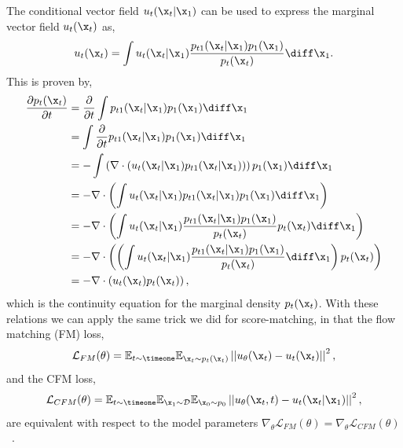 The conditional vector field $u_t(\x_t | \x_1)$ can be used to express the marginal vector field $u_t(\x_t)$ as,
\begin{equation}
    \label{eq:conditional_to_marginal}
    u_t(\x_t) = \int u_t(\x_t | \x_1) \frac{p_{t1}(\x_t | \x_1) p_1(\x_1)}{p_t(\x_t)} \diff \x_1.
\end{equation}
This is proven by,
\begin{equation}
    \begin{aligned}
        \frac{\partial p_t(\x_t)}{\partial t}
         & = \frac{\partial}{\partial t} \int p_{t1}(\x_t | \x_1) p_1(\x_1) \diff \x_1                                                            \\
         & = \int \frac{\partial}{\partial t} p_{t1}(\x_t | \x_1) p_1(\x_1) \diff \x_1                                                            \\
         & = - \int \left(\nabla \cdot (u_t(\x_t | \x_1) p_{t1}(\x_t | \x_1))\right) p_1(\x_1) \diff \x_1                                         \\
         & = - \nabla \cdot \left(\int u_t(\x_t | \x_1) p_{t1}(\x_t | \x_1) p_1(\x_1) \diff \x_1\right)                                           \\
         & = - \nabla \cdot \left(\int u_t(\x_t | \x_1) \frac{p_{t1}(\x_t | \x_1) p_1(\x_1)}{p_t(\x_t)} p_t(\x_t) \diff \x_1\right)               \\
         & = - \nabla \cdot \left(\left(\int u_t(\x_t | \x_1) \frac{p_{t1}(\x_t | \x_1) p_1(\x_1)}{p_t(\x_t)} \diff \x_1\right) p_t(\x_t) \right) \\
         & = - \nabla \cdot \left(u_t(\x_t) p_t(\x_t)\right),
    \end{aligned}
\end{equation}
which is the continuity equation for the marginal density $p_t(\x_t)$.
With these relations we can apply the same trick we did for score-matching, in that the flow matching (FM) loss,
\begin{equation}
    \label{eq:fm_loss}
    \mathcal{L}_{FM}(\theta) =
    \mathbb{E}_{t \sim \timeone}
    \mathbb{E}_{\x_t \sim p_t(\x_t)}
    \left|\left|u_\theta(\x_t) - u_t(\x_t)\right|\right|^2,
\end{equation}
and the CFM loss,
\begin{equation}
    \label{eq:cfm_loss}
    \mathcal{L}_{CFM}(\theta) =
    \mathbb{E}_{t \sim \timeone}
    \mathbb{E}_{\x_1 \sim \mathcal{D}}
    \mathbb{E}_{\x_0 \sim p_0}
    \left|\left|u_\theta(\x_t, t) - u_t(\x_t | \x_1)\right|\right|^2,
\end{equation}
are equivalent with respect to the model parameters $\nabla_{\theta} \mathcal{L}_{FM}(\theta) = \nabla_{\theta} \mathcal{L}_{CFM}(\theta)$~\cite{FlowMatchingGenerative}.

